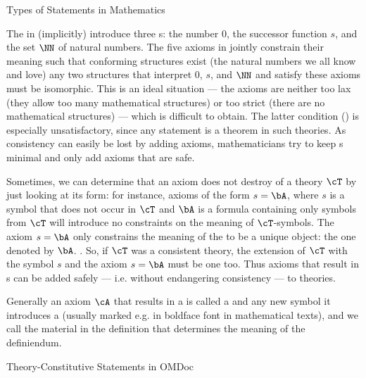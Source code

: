 \begin{omgroup}[short=Mathematical Statements,id=statements]
\begin{omgroup}[id=statements-constitutive]{Types of Statements in Mathematics}
\begin{module}[id=statementtypes]
The {} in {} (implicitly) introduce three
{s}: the number 0, the successor function $s$, and the set $\NN$ of
natural numbers. The five axioms in {} jointly constrain their meaning
such that conforming structures exist (the natural numbers we all know and love) any two
structures that interpret 0, $s$, and $\NN$ and satisfy these axioms must be isomorphic.
This is an ideal situation --- the axioms are neither too lax (they allow too many
mathematical structures) or too strict (there are no mathematical structures) --- which is
difficult to obtain. The latter condition () is
especially unsatisfactory, since any statement is a theorem in such theories. As
consistency can easily be lost by adding axioms, mathematicians try to keep
{s} minimal and only add axioms that are safe.
  
Sometimes, we can determine that an axiom does not destroy {} of a
theory $\cT$ by just looking at its form: for instance, axioms of the form $s=\bA$, where
$s$ is a symbol that does not occur in $\cT$ and $\bA$ is a formula containing only
symbols from $\cT$ will introduce no constraints on the meaning of $\cT$-symbols. The
axiom $s=\bA$ only constrains the meaning of the {} to be a unique
object: the one denoted by $\bA$. . So, if $\cT$ was a consistent theory,
the extension of $\cT$ with the symbol $s$ and the axiom $s=\bA$ must be one too. Thus
axioms that result in {s} can be added safely ---
i.e. without endangering consistency --- to theories.
  
\begin{definition}[display=flow,id=conservative-extension.def]
  Generally an axiom $\cA$ that results in a {} is called
  a {} and any new symbol it introduces a {} (usually
  marked e.g. in boldface font in mathematical texts), and we call {} the
  material in the definition that determines the meaning of the definiendum.
\end{definition}
\end{module}
\end{omgroup}

\begin{omgroup}[id=constitutive-statements]{Theory-Constitutive Statements in OMDoc}
\begin{module}[id=constitutive-statements]


\end{module}
\end{omgroup}
\end{omgroup}
